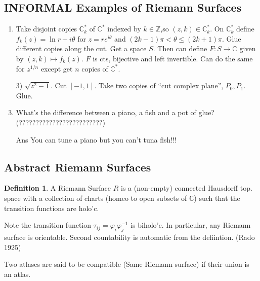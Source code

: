 \documentclass{article}
\theoremstyle{definition}
\newtheorem{defn}{Definition}[section]
\theoremstyle{remark}
\theoremstyle{plain}
\newcommand{\ZZ}{\mathbb{Z}}
\newcommand{\CC}{\mathbb{C}}
\begin{document}
\subsection{INFORMAL Examples of Riemann Surfaces}
\begin{enumerate}[1)]
    \item Take disjoint copies $\CC_k^\ast$ of $\CC^\ast$ indexed by $k\in\ZZ$,so $(z,k)\in\CC_k^\ast$. On $\CC_k^\ast$ define $f_k(z)=\ln r+i\theta$ for $z=re^{i\theta}$ and $(2k-1)\pi<\theta\le(2k+1)\pi$. Glue different copies along the cut. Get a space $S$. Then can define $F:S\to\CC$ given by $(z,k)\mapsto f_k(z)$. $F$ is cts, bijective and left invertible. Can do the same for $z^{1/n}$ except get $n$ copies of $\CC^\ast$.
    \item[3)] $\sqrt{z^2-1}$. Cut $[-1,1]$. Take two copies of ``cut complex plane'', $P_0,P_1$. Glue.
    \item What's the difference between a piano, a fish and a pot of glue? (?????????????????????????)
    \item[Ans] You can tune a piano but you can't tuna fish!!!
\end{enumerate}
\subsection{Abstract Riemann Surfaces}
\begin{defn}
    A Riemann Surface $R$ is a (non-empty) connected Hausdorff top. space with a collection of charts (homeo to open subsets of $\CC$) such that the transition functions are holo'c.
\end{defn}
Note the transition function $\tau_{ij}=\varphi_i\varphi_j^{-1}$ is biholo'c. In particular, any Riemann surface is orientable. Second countability is automatic from the defiintion. (Rado 1925)

Two atlases are said to be compatible (Same Riemann surface) if their union is an atlas.
\end{document}
